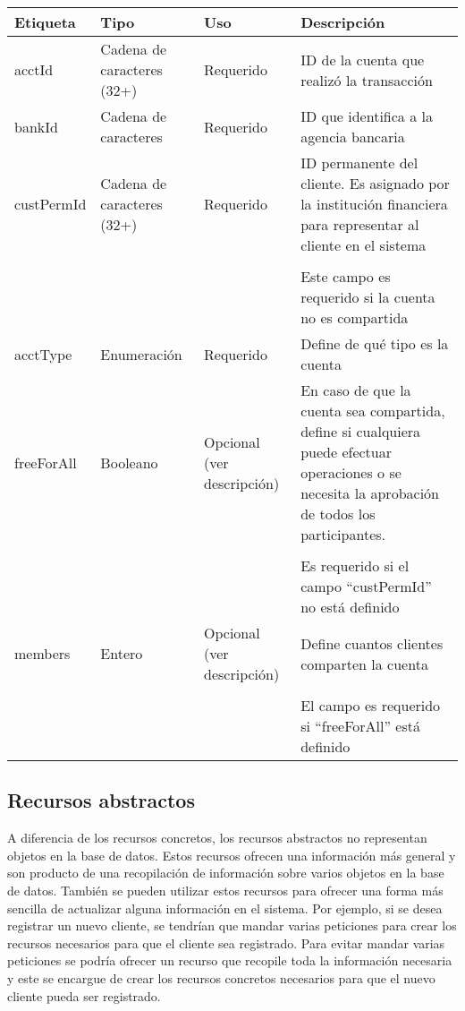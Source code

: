 \begin{center}
\begin{longtable}{|>{\centering\arraybackslash}p{}|>{\centering\arraybackslash}p{}|>{\centering\arraybackslash}p{}|>{\centering\arraybackslash}p{}|}
\hline 
\bfseries {Etiqueta} & \bfseries {Tipo} & \bfseries {Uso} & \bfseries {Descripción} \\ 
\hline
acctId & Cadena de caracteres (32+) & Requerido & ID de la cuenta que realizó la transacción \\ 
\hline 
bankId & Cadena de caracteres & Requerido & ID que identifica a la agencia bancaria \\
\hline 
custPermId & Cadena de caracteres (32+) & Requerido & ID permanente del cliente. Es asignado por la institución financiera para representar al cliente en el sistema 
\\ & & & \\
& & & Este campo es requerido si la cuenta no es compartida \\
\hline
acctType & Enumeración & Requerido & Define de qué tipo es la cuenta \\
\hline
freeForAll & Booleano & Opcional (ver descripción) & En caso de que la cuenta sea compartida, define si cualquiera puede efectuar operaciones o se necesita la aprobación de todos los participantes.
\\ & & & \\
& & & Es requerido si el campo ``custPermId'' no está definido \\
\hline 
members & Entero & Opcional (ver descripción) & Define cuantos clientes comparten la cuenta
\\ & & & \\
& & & El campo es requerido si ``freeForAll'' está definido \\
\hline 
\end{longtable}
\end{center}

\subsection{Recursos abstractos}
A diferencia de los recursos concretos, los recursos abstractos no representan objetos en la base de datos. Estos recursos ofrecen una información más general y son producto de una recopilación de información sobre varios objetos en la base de datos. También se pueden utilizar estos recursos para ofrecer una forma más sencilla de actualizar alguna información en el sistema. Por ejemplo, si se desea registrar un nuevo cliente, se tendrían que mandar varias peticiones para crear los recursos necesarios para que el cliente sea registrado. Para evitar mandar varias peticiones se podría ofrecer un recurso que recopile toda la información necesaria y este se encargue de crear los recursos concretos necesarios para que el nuevo cliente pueda ser registrado.
%